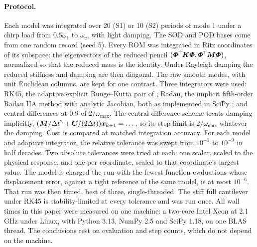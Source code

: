 \documentclass[11pt]{article}
\begin{document}
\paragraph{Protocol.} Each model was integrated over 20 (S1) or 10 (S2) periods of mode 1 under a chirp load from $0.5\omega_1$ to $\omega_{\mathrm c}$, with light damping. The SOD and POD bases come from one random record (seed 5).
Every ROM was integrated in Ritz coordinates of its subspace: the eigenvectors of the reduced pencil $(\bm{\varPhi}^{\mathsf T}\bm{K}\bm{\varPhi},\bm{\varPhi}^{\mathsf T}\bm{M}\bm{\varPhi})$, normalized so that the reduced mass is the identity. Under Rayleigh damping the reduced stiffness and damping are then diagonal. The raw smooth modes, with unit Euclidean columns, are kept for one contrast.
Three integrators were used: RK45, the adaptive explicit Runge--Kutta pair of \citet{Dormand1980}; Radau, the implicit fifth-order Radau IIA method \citep{Hairer1996} with analytic Jacobian, both as implemented in SciPy \citep{Virtanen2020}; and central differences at 0.9 of $2/\omega_{\max}$. The central-difference scheme treats damping implicitly, $(\bm{M}/\Delta t^2+\bm{C}/(2\Delta t))\bm{x}_{k+1}=\dots$, so its step limit is $2/\omega_{\max}$ whatever the damping.
Cost is compared at matched integration accuracy. For each model and adaptive integrator, the relative tolerance was swept from $10^{-3}$ to $10^{-9}$ in half decades. Two absolute tolerances were tried at each: one scalar, scaled to the physical response, and one per coordinate, scaled to that coordinate's largest value. The model is charged the run with the fewest function evaluations whose displacement error, against a tight reference of the same model, is at most $10^{-6}$. That run was then timed, best of three, single-threaded. The stiff full cantilever under RK45 is stability-limited at every tolerance and was run once.
All wall times in this paper were measured on one machine: a two-core Intel Xeon at 2.1\,GHz under Linux, with Python 3.13, NumPy 2.5 and SciPy 1.18, on one BLAS thread. The conclusions rest on evaluation and step counts, which do not depend on the machine.

\begin{table}[t]
\centering\small
\caption{Integration cost at matched integration accuracy: the least work to reach a displacement error of $10^{-6}$; light Rayleigh damping, chirp load. ROMs in Ritz coordinates of their subspace; ``raw'' is the same SOD subspace in unit-Euclidean smooth modes. $\rho(\bm{A}_r)$: spectral radius of the first-order state matrix. CD: central-difference steps at 0.9 of $2/\omega_{\max}$. LU: Radau matrix factorizations. --: the single stability-limited RK45 run did not reach $10^{-6}$. Script: \texttt{c36\_cost\_matched.py}, table \texttt{mktab\_c\_cost.py}.}
\label{tab:cost}
\resizebox{\textwidth}{!}{}
\end{table}
\end{document}
